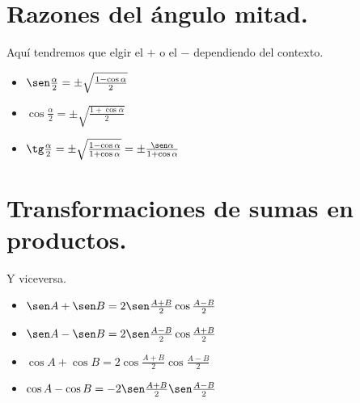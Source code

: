 \documentclass[a4paper,9pt,answers]{exam}
\begin{document}
\section{Razones del ángulo mitad.}
Aquí tendremos que elgir el $+$ o el $-$ dependiendo del contexto.
\begin{itemize}
	\item $\sen \frac{\alpha}{2} = \pm \sqrt{\frac{1 - \cos \alpha}{2}}$
	\item $\cos \frac{\alpha}{2} = \pm \sqrt{\frac{1 + \cos \alpha}{2}}$
	\item $\tg \frac{\alpha}{2} = \pm \sqrt{\frac{1 - \cos \alpha}{1 + \cos \alpha}} = \pm \frac{\sen \alpha}{1 + \cos \alpha}$
\end{itemize}
\section{Transformaciones de sumas en productos.}
Y viceversa.
\begin{itemize}
	\item $\sen A + \sen B = 2 \sen \frac{A + B}{2} \cos\frac{A -B}{2}$
	\item $\sen A - \sen B = 2 \sen \frac{A-B}{2} \cos \frac{A+B}{2}$
	\item $\cos A + \cos B = 2 \cos \frac{A + B}{2} \cos \frac{A - B}{2}$
	\item $\cos A - \cos B = -2\sen \frac{A + B}{2} \sen \frac{A - B}{2}$
\end{itemize}
\end{document}
